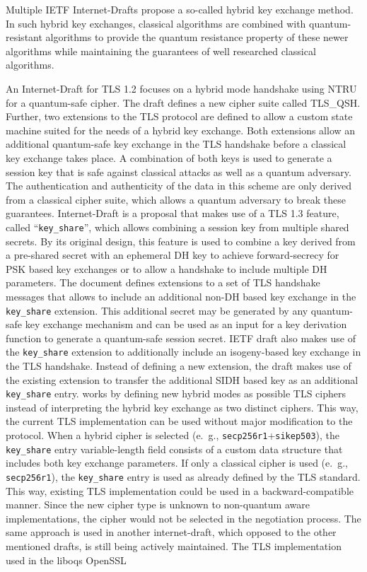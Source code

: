 Multiple \ac{IETF} Internet-Drafts propose a so-called hybrid key exchange method. In such hybrid key exchanges, classical algorithms are combined with quantum-resistant algorithms to provide the quantum resistance property of these newer algorithms while maintaining the guarantees of well researched classical algorithms. 

An Internet-Draft for TLS 1.2\cite{whyte-qsh-tls12-02} focuses on a hybrid mode handshake using NTRU for a quantum-safe cipher. The draft defines a new cipher suite called TLS\_QSH. Further, two extensions to the TLS protocol are defined to allow a custom state machine suited for the needs of a hybrid key exchange. Both extensions allow an additional quantum-safe key exchange in the TLS handshake before a classical key exchange takes place. A combination of both keys is used to generate a session key that is safe against classical attacks as well as a quantum adversary. The authentication and authenticity of the data in this scheme are only derived from a classical cipher suite, which allows a quantum adversary to break these guarantees. Internet-Draft \cite{schanck-tls-additional-keyshare-00} is a proposal that makes use of a TLS 1.3 feature, called ``\texttt{key\_share}'', which allows combining a session key from multiple shared secrets. By its original design, this feature is used to combine a key derived from a pre-shared secret with an ephemeral \ac{DH} key to achieve forward-secrecy for PSK based key exchanges or to allow a handshake to include multiple DH parameters. The document defines extensions to a set of TLS handshake messages that allows to include an additional non-\ac{DH} based key exchange in the \texttt{key\_share} extension. This additional secret may be generated by any quantum-safe key exchange mechanism and can be used as an input for a key derivation function to generate a quantum-safe session secret. IETF draft \cite{kiefer-tls-ecdhe-sidh-00} also makes use of the \texttt{key\_share} extension to additionally include an isogeny-based key exchange in the TLS handshake. Instead of defining a new extension, the draft makes use of the existing extension to transfer the additional \ac{SIDH} based key as an additional \texttt{key\_share} entry. \cite{whyte-qsh-tls13-06} works by defining new hybrid modes as possible TLS ciphers instead of interpreting the hybrid key exchange as two distinct ciphers. This way, the current TLS implementation can be used without major modification to the protocol. When a hybrid cipher is selected (e.\ g., \texttt{secp256r1}+\texttt{sikep503}), the \texttt{key\_share} entry variable-length field consists of a custom data structure that includes both key exchange parameters. If only a classical cipher is used (e.\ g., \texttt{secp256r1}), the \texttt{key\_share} entry is used as already defined by the TLS standard. This way, existing TLS implementation could be used in a backward-compatible manner. Since the new cipher type is unknown to non-quantum aware implementations, the cipher would not be selected in the negotiation process. The same approach is used in another internet-draft\cite{ietf-tls-hybrid-design-02}, which opposed to the other mentioned drafts, is still being actively maintained. The TLS implementation used in the liboqs OpenSSL 
